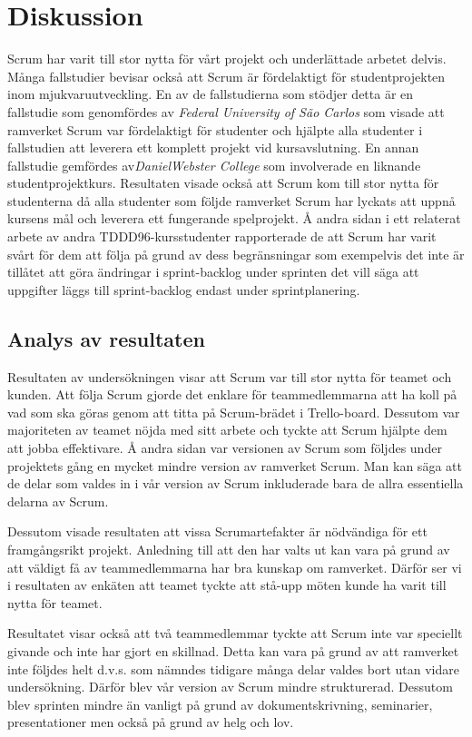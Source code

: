 
\section{Diskussion}
\label{sec:Lieth_Wahid-discussion}
Scrum har varit till stor nytta för vårt projekt och underlättade arbetet delvis. Många fallstudier bevisar också att Scrum är fördelaktigt för studentprojekten inom mjukvaruutveckling. En av de fallstudierna som stödjer detta är
en fallstudie som genomfördes av \textit{Federal University of São Carlos} som visade att ramverket Scrum var fördelaktigt för studenter och hjälpte alla studenter i fallstudien att leverera ett komplett projekt vid kursavslutning. En annan fallstudie gemfördes av\textit{DanielWebster College} som involverade en liknande studentprojektkurs.\cite{GameDesign} Resultaten visade också att Scrum kom till stor nytta för studenterna då alla studenter som följde ramverket Scrum har lyckats att uppnå kursens mål och leverera ett fungerande spelprojekt. Å andra sidan i ett relaterat arbete av andra TDDD96-kursstudenter rapporterade de att Scrum har varit svårt för dem att följa på grund av dess begränsningar som exempelvis det inte är tillåtet att göra ändringar i sprint-backlog under sprinten det vill säga att uppgifter läggs till sprint-backlog endast under sprintplanering.\cite{overvakn73:online}


\subsection{Analys av resultaten}
Resultaten av undersökningen visar att Scrum var till stor nytta för teamet och kunden. Att följa Scrum gjorde det enklare för teammedlemmarna att ha koll på vad som ska göras genom att titta på Scrum-brädet i Trello-board. Dessutom var majoriteten av teamet nöjda med sitt arbete och tyckte att Scrum hjälpte dem att jobba effektivare. Å andra sidan var versionen av Scrum som följdes under projektets gång en mycket mindre version av ramverket Scrum. Man kan säga att de delar som valdes in i vår version av Scrum inkluderade bara de allra essentiella delarna av Scrum.

Dessutom visade resultaten att vissa Scrumartefakter är nödvändiga för ett framgångsrikt projekt. Anledning till att den har valts ut kan vara på grund av att väldigt få av teammedlemmarna har bra kunskap om ramverket. Därför ser vi i resultaten av enkäten att teamet tyckte att stå-upp möten kunde ha varit till nytta för teamet. 

Resultatet visar också  att två teammedlemmar tyckte att Scrum inte var speciellt givande och inte har gjort en skillnad. Detta kan vara på grund av att ramverket inte följdes helt d.v.s. som nämndes tidigare många delar valdes bort utan vidare undersökning. Därför blev vår version av Scrum mindre strukturerad. Dessutom blev sprinten mindre än vanligt på grund av dokumentskrivning, seminarier, presentationer men också på grund av helg och lov.
